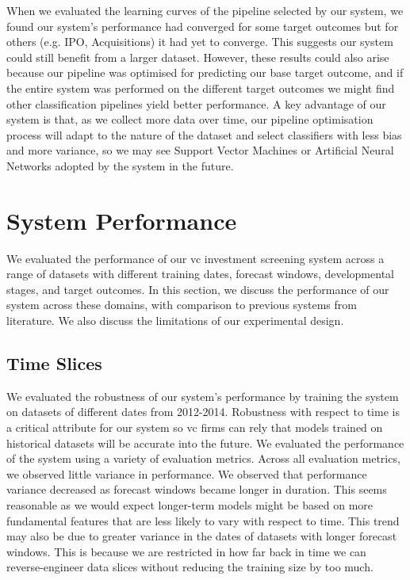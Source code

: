 \documentclass[../thesis/thesis.tex]{subfiles}
\begin{document}
When we evaluated the learning curves of the pipeline selected by our system, we found our system's performance had converged for some target outcomes but for others (e.g. IPO, Acquisitions) it had yet to converge. This suggests our system could still benefit from a larger dataset. However, these results could also arise because our pipeline was optimised for predicting our base target outcome, and if the entire system was performed on the different target outcomes we might find other classification pipelines yield better performance. A key advantage of our system is that, as we collect more data over time, our pipeline optimisation process will adapt to the nature of the dataset and select classifiers with less bias and more variance, so we may see Support Vector Machines or Artificial Neural Networks adopted by the system in the future.

\section{System Performance}

We evaluated the performance of our \gls{vc} investment screening system across a range of datasets with different training dates, forecast windows, developmental stages, and target outcomes. In this section, we discuss the performance of our system across these domains, with comparison to previous systems from literature. We also discuss the limitations of our experimental design.

\subsection{Time Slices}

We evaluated the robustness of our system's performance by training the system on datasets of different dates from 2012-2014. Robustness with respect to time is a critical attribute for our system so \gls{vc} firms can rely that models trained on historical datasets will be accurate into the future. We evaluated the performance of the system using a variety of evaluation metrics. Across all evaluation metrics, we observed little variance in performance. We observed that performance variance decreased as forecast windows became longer in duration. This seems reasonable as we would expect longer-term models might be based on more fundamental features that are less likely to vary with respect to time. This trend may also be due to greater variance in the dates of datasets with longer forecast windows. This is because we are restricted in how far back in time we can reverse-engineer data slices without reducing the training size by too much.
\end{document}
